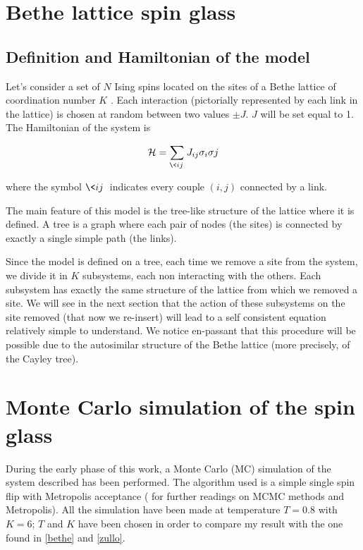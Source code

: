 \section{Bethe lattice spin glass}

\subsection{Definition and Hamiltonian of the model}

Let's consider a set of $N$ Ising spins located on the sites of a Bethe lattice of coordination number $K$ . Each interaction (pictorially represented by each link in the lattice) is chosen at random between two values $\pm J$. $J$ will be set equal to 1. The Hamiltonian of the system is

\begin{equation}	
\mathcal{H}= \sum_{\<ij\>} J_{ij} \sigma_{i}\sigma{j}
\label{hamiltonian}
\end{equation}

where the symbol $\<ij\>$ indicates every couple $(i,j)$ connected by a link.

The main feature of this model is the tree-like structure of the lattice where it is defined. A tree is a graph where each pair of nodes (the sites) is connected by exactly a single simple path (the links).

Since the model is defined on a tree, each time we remove a site from the system, we divide it in $K$ subsystems, each non interacting with the others. Each subsystem has exactly the same structure of the lattice from which we removed a site. We will see in the next section that the action of these subsystems on the site removed (that now we re-insert) will lead to a self consistent equation relatively simple to understand.
We notice en-passant that this procedure will be possible due to the autosimilar structure of the Bethe lattice (more precisely, of the Cayley tree).

\section{Monte Carlo simulation of the spin glass}

During the early phase of this work, a Monte Carlo (MC) simulation of the system described has been performed. The algorithm used is a simple single spin flip with Metropolis acceptance (\cite{MCMC} for further readings on MCMC methods and Metropolis).
All the simulation have been made at temperature $T = 0.8$ with $K = 6 $; $T$ and $K$ have been chosen in order to compare my result with the one found in \ref{bethe} and \ref{zullo}.

